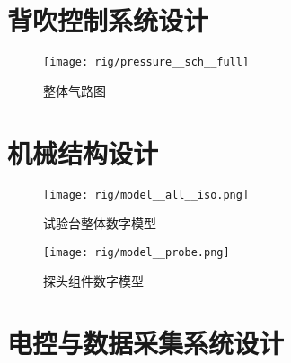 \section{背吹控制系统设计}\label{sec:rig-pressure}

\begin{figure}[tbh]
\centering
\texttt{[image: rig/pressure\_\_sch\_\_full]}
\caption{整体气路图}
\label{fig:rig-pressure-sch-full}
\end{figure}



\section{机械结构设计}\label{sec:rig-model}

\begin{figure}[p]
\centering
\texttt{[image: rig/model\_\_all\_\_iso.png]}
\caption{试验台整体数字模型}
\label{fig:rig-model-all-iso}
\end{figure}

\begin{figure}[tbhp]
\centering
\texttt{[image: rig/model\_\_probe.png]}
\caption{探头组件数字模型}
\label{fig:rig-model-probe}
\end{figure}



\section{电控与数据采集系统设计}
